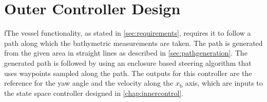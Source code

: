 \chapter{Outer Controller Design}\label{chap:outerController}
fThe vessel functionality, as stated in \autoref{sec:requirements}, requires it to follow a path along which the bathymetric measurements are taken. The path is generated from the given area in straight lines as described in \autoref{sec:pathgeneration}.  The generated path is followed by using an enclosure based steering algorithm \cite[pp. 258-265]{TFossen} that uses waypoints sampled along the path. The outputs for this controller are the reference for the yaw angle and the velocity along the $x_\mathrm{b}$ axis, which are inputs to the state space controller designed in \autoref{chap:innercontrol}.